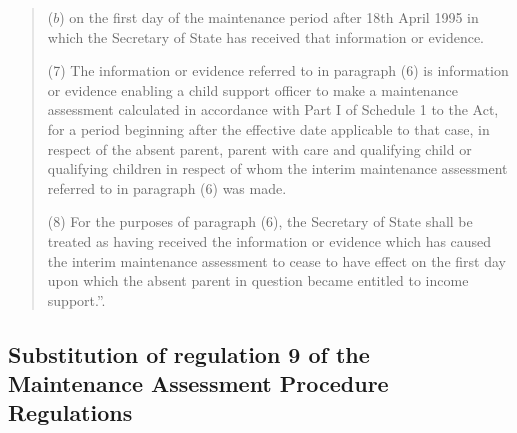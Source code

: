 \documentclass[12pt,a4paper]{article}
\begin{document}
\begin{quotation}
\begin{enumerate}
($b$) on the first day of the maintenance period after 18th April 1995 in which the Secretary of State has received that information or evidence.
\end{enumerate}

(7) The information or evidence referred to in paragraph (6) is information or evidence enabling a child support officer to make a maintenance assessment calculated in accordance with Part I of Schedule 1 to the Act, for a period beginning after the effective date applicable to that case, in respect of the absent parent, parent with care and qualifying child or qualifying children in respect of whom the interim maintenance assessment referred to in paragraph (6) was made.

(8) For the purposes of paragraph (6), the Secretary of State shall be treated as having received the information or evidence which has caused the interim maintenance assessment to cease to have effect on the first day upon which the absent parent in question became entitled to income support.”.
\end{quotation}

\subsection[17. Substitution of regulation 9 of the Maintenance Assessment Procedure Regulations]{\sloppy Substitution of regulation 9 of the Maintenance Assessment Procedure Regulations}
\end{document}
